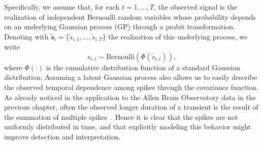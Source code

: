 Specifically, we assume that, for each $t=1,\dots,T$, the observed signal is the realization of independent Bernoulli random variables whose probability depends on an underlying Gaussian process (GP) through a probit transformation. Denoting with $\tilde{\bm{s}}_i = \{\tilde{s}_{i,1},\dots,\tilde{s}_{i,T}\}$ the realization of this underlying process, we write
\begin{equation*}
s_{i,t} \sim \mathrm{Bernoulli}(\Phi(\tilde{s}_{i,t})),
\end{equation*}
where $\Phi(\cdot)$ is the cumulative distribution function of a standard Gaussian distribution.
Assuming a latent Gaussian process also allows us to easily describe the observed temporal dependence among spikes through the covariance function. As already noticed in the application to the Allen Brain Observatory data in the previous chapter, often the observed longer duration of a transient is the result of the summation of multiple spikes~\parencite{dombeck2010}. Hence it is clear that the spikes are not uniformly distributed in time, and that explicitly modeling this behavior might improve detection and interpretation.

